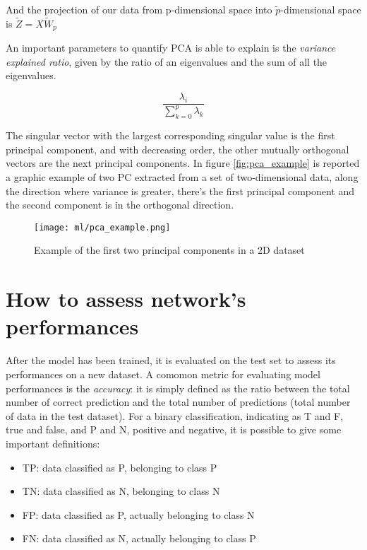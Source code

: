\documentclass[11pt]{report}
\begin{document}
And the projection of our data from p-dimensional space into $\tilde p$-dimensional space is $\tilde Z = X\tilde W_p$

An important parameters to quantify  PCA is able to explain is the \emph{variance explained ratio}, given by the ratio of an eigenvalues and the sum of all the eigenvalues.

\begin{equation}
\frac{\lambda_i}{\sum_{k = 0}^p \lambda_k}
\end{equation}

The singular vector with the largest corresponding singular value is the first principal component, and with decreasing order, the other mutually orthogonal vectors are the next principal components.
In figure \ref{fig:pca_example} is reported a graphic example of two PC extracted from a set of two-dimensional data, along the direction where variance is greater, there's the first principal component and the second component is in the orthogonal direction.

\begin{figure}[h]
\centering
\texttt{[image: ml/pca\_example.png]}
\caption{Example of the first two principal components in a 2D dataset}
\end{figure}




\section{How to assess network's performances}
After the model has been trained, it is evaluated on the test set to assess its performances on a new dataset.
A comomon metric for evaluating model performances is the \emph{accuracy}: it is simply defined as the ratio between the total number of correct prediction and the total number of predictions (total number of data in the test dataset).
For a binary classification, indicating as T and F, true and false, and P and N, positive and negative, it is possible to give some important definitions:
\begin{itemize}
\item TP: data classified as P, belonging to class P
\item TN: data classified as N, belonging to class N
\item FP: data classified as P, actually belonging to class N
\item FN: data classified as N, actually belonging to class P
\end{itemize}
\end{document}
